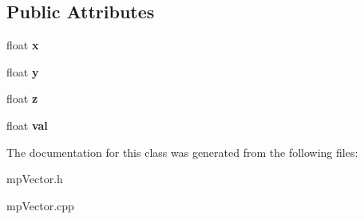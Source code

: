 \subsection*{Public Attributes}
\begin{DoxyCompactItemize}
\item 
\mbox{\label{classmp4_vector_a782f4e4d51dcea4fe2bbd584b8ef41e0}} 
float {\bfseries x}
\item 
\mbox{\label{classmp4_vector_a66db26ed8f888cd4ca2c35fdc8a032e1}} 
float {\bfseries y}
\item 
\mbox{\label{classmp4_vector_a437daa2a3c8dadf95cb54f348e2409dd}} 
float {\bfseries z}
\item 
\mbox{\label{classmp4_vector_a032b746949a425c01014f0081aaff106}} 
float {\bfseries val}
\end{DoxyCompactItemize}


The documentation for this class was generated from the following files\+:\begin{DoxyCompactItemize}
\item 
mp\+Vector.\+h\item 
mp\+Vector.\+cpp\end{DoxyCompactItemize}
